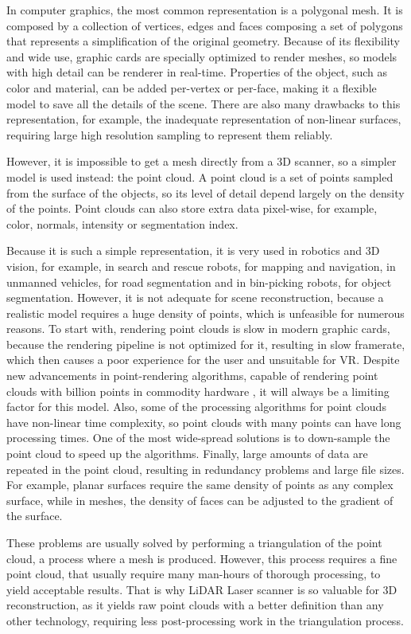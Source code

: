 In computer graphics, the most common representation is a polygonal mesh. It is composed by a collection of vertices, edges and faces composing a set of polygons that represents a simplification of the original geometry. Because of its flexibility and wide use, graphic cards are specially optimized to render meshes, so models with high detail can be renderer in real-time. Properties of the object, such as color and material, can be added per-vertex or per-face, making it a flexible model to save all the details of the scene. There are also many drawbacks to this representation, for example, the inadequate representation of non-linear surfaces, requiring large high resolution sampling to represent them reliably.

However, it is impossible to get a mesh directly from a 3D scanner, so a simpler model is used instead: the point cloud. A point cloud is a set of points sampled from the surface of the objects, so its level of  detail depend largely on the density of the points. Point clouds can also store extra data pixel-wise, for example, color, normals, intensity or segmentation index.

Because it is such a simple representation, it is very used in robotics and 3D vision, for example, in search and rescue robots, for mapping and navigation, in unmanned vehicles, for road segmentation and in bin-picking robots, for object segmentation. However, it is not adequate for scene reconstruction, because a realistic model requires a huge density of points, which is unfeasible for numerous reasons. To start with, rendering point clouds is slow in modern graphic cards, because the rendering pipeline is not optimized for it, resulting in slow framerate, which then causes a poor experience for the user and unsuitable for VR. Despite new advancements in point-rendering algorithms, capable of rendering point clouds with billion points in commodity hardware \cite{wimmer2006}, it will always be a limiting factor for this model. Also, some of the processing algorithms for point clouds have non-linear time complexity, so point clouds with many points can have long processing times. One of the most wide-spread solutions is to down-sample the point cloud to speed up the algorithms. Finally, large amounts of data are repeated in the point cloud, resulting in redundancy problems and large file sizes. For example, planar surfaces require the same density of points as any complex surface, while in meshes, the density of faces can be adjusted to the gradient of the surface.

These problems are usually solved by performing a triangulation of the point cloud, a process where a mesh is produced. However, this process requires a fine point cloud, that usually require many man-hours of thorough processing, to yield acceptable results. That is why LiDAR Laser scanner is so valuable for 3D reconstruction, as it yields raw point clouds with a better definition than any other technology, requiring less post-processing work in the triangulation process.
